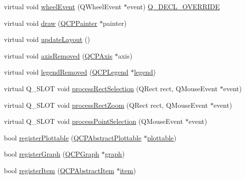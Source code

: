 \begin{DoxyCompactItemize}
\item 
virtual void \mbox{\hyperlink{class_q_custom_plot_a7848c9ac8be60bbd8fcea9b53be543c5}{wheel\+Event}} (Q\+Wheel\+Event $\ast$event) \mbox{\hyperlink{qcustomplot_8h_a42cc5eaeb25b85f8b52d2a4b94c56f55}{Q\+\_\+\+D\+E\+C\+L\+\_\+\+O\+V\+E\+R\+R\+I\+DE}}
\item 
virtual void \mbox{\hyperlink{class_q_custom_plot_ad7a7d878bf050f101a43008e7d8fdb52}{draw}} (\mbox{\hyperlink{class_q_c_p_painter}{Q\+C\+P\+Painter}} $\ast$painter)
\item 
virtual void \mbox{\hyperlink{class_q_custom_plot_a6e6693e2c249f65437382ffd93405e04}{update\+Layout}} ()
\item 
virtual void \mbox{\hyperlink{class_q_custom_plot_a8b46607021c463c94709d3504951cb47}{axis\+Removed}} (\mbox{\hyperlink{class_q_c_p_axis}{Q\+C\+P\+Axis}} $\ast$axis)
\item 
virtual void \mbox{\hyperlink{class_q_custom_plot_a9d173454555021c9ffd4f675c4d9037a}{legend\+Removed}} (\mbox{\hyperlink{class_q_c_p_legend}{Q\+C\+P\+Legend}} $\ast$\mbox{\hyperlink{class_q_custom_plot_a4eadcd237dc6a09938b68b16877fa6af}{legend}})
\item 
virtual Q\+\_\+\+S\+L\+OT void \mbox{\hyperlink{class_q_custom_plot_ac10849411e1d0e858ea7f29c8ade364c}{process\+Rect\+Selection}} (Q\+Rect rect, Q\+Mouse\+Event $\ast$event)
\item 
virtual Q\+\_\+\+S\+L\+OT void \mbox{\hyperlink{class_q_custom_plot_a5508a207dcc279f316142f96d984bba3}{process\+Rect\+Zoom}} (Q\+Rect rect, Q\+Mouse\+Event $\ast$event)
\item 
virtual Q\+\_\+\+S\+L\+OT void \mbox{\hyperlink{class_q_custom_plot_ac13c10fff6613e3e80e13c787b010838}{process\+Point\+Selection}} (Q\+Mouse\+Event $\ast$event)
\item 
bool \mbox{\hyperlink{class_q_custom_plot_aeba7733bb9fadfb5a375b3f40de9e58a}{register\+Plottable}} (\mbox{\hyperlink{class_q_c_p_abstract_plottable}{Q\+C\+P\+Abstract\+Plottable}} $\ast$\mbox{\hyperlink{class_q_custom_plot_a32de81ff53e263e785b83b52ecd99d6f}{plottable}})
\item 
bool \mbox{\hyperlink{class_q_custom_plot_acfc01230bddaea4f1782e4aa7d130af6}{register\+Graph}} (\mbox{\hyperlink{class_q_c_p_graph}{Q\+C\+P\+Graph}} $\ast$\mbox{\hyperlink{class_q_custom_plot_a6ecae130f684b25276fb47bd3a5875c6}{graph}})
\item 
bool \mbox{\hyperlink{class_q_custom_plot_afbd4010b2e3f364c8d512691b2a1640a}{register\+Item}} (\mbox{\hyperlink{class_q_c_p_abstract_item}{Q\+C\+P\+Abstract\+Item}} $\ast$\mbox{\hyperlink{class_q_custom_plot_ac042f2e78edd228ccf2f26b7fe215239}{item}})

\end{DoxyCompactItemize}
